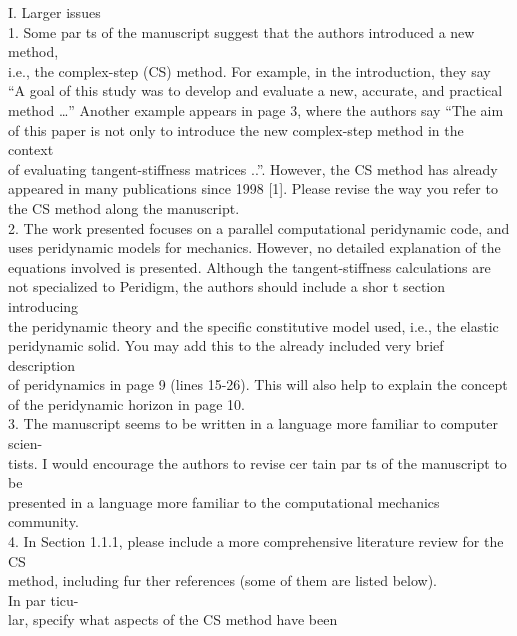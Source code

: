 I. Larger issues \\

1. Some par ts of the manuscript suggest that the authors introduced a
new method, \\i.e., the complex-step (CS) method. For example, in the
introduction, they say \\``A goal of this study was to develop and
evaluate a new, accurate, and practical \\method \ldots{}'' Another
example appears in page 3, where the authors say ``The aim \\of this
paper is not only to introduce the new complex-step method in the
context \\of evaluating tangent-stiffness matrices ..''. However, the CS
method has already \\appeared in many publications since 1998 {[}1{]}.
Please revise the way you refer to \\the CS method along the manuscript.
\\2. The work presented focuses on a parallel computational peridynamic
code, and \\uses peridynamic models for mechanics. However, no detailed
explanation of the \\equations involved is presented. Although the
tangent-stiffness calculations are \\not specialized to Peridigm, the
authors should include a shor t section introducing \\the peridynamic
theory and the speciﬁc constitutive model used, i.e., the elastic
\\peridynamic solid. You may add this to the already included very brief
description \\of peridynamics in page 9 (lines 15-26). This will also
help to explain the concept \\of the peridynamic horizon in page 10.
\\3. The manuscript seems to be written in a language more familiar to
computer scien- \\tists. I would encourage the authors to revise cer
tain par ts of the manuscript to be \\presented in a language more
familiar to the computational mechanics community. \\4. In Section
1.1.1, please include a more comprehensive literature review for the CS
\\method, including fur ther references (some of them are listed below).
\\In par ticu- \\lar, specify what aspects of the CS method have been
